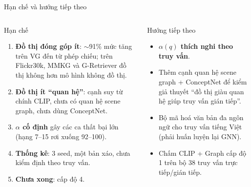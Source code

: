 \documentclass[10pt, aspectratio=169]{beamer}
\begin{document}
\begin{frame}{Hạn chế và hướng tiếp theo}
  \begin{columns}[T]
      \begin{alertblock}{Hạn chế}
        \begin{enumerate}\small
          \item \textbf{Đồ thị đóng góp ít}: $\sim$91\% mức tăng trên VG đến từ phép chiếu; trên Flickr30k, MMKG và G-Retriever đồ thị không hơn mô hình không đồ thị.
          \item \textbf{Đồ thị ít ``quan hệ''}: cạnh suy từ chính CLIP, chưa có quan hệ scene graph, chưa dùng ConceptNet.
          \item \textbf{$\alpha$ cố định} gây các ca thất bại lớn (hạng 7--15 rơi xuống 92--100).
          \item \textbf{Thống kê}: 3 seed, một bản xáo, chưa kiểm định theo truy vấn.
          \item \textbf{Chưa xong}: cấp độ 4.
        \end{enumerate}
      \end{alertblock}
      \begin{exampleblock}{Hướng tiếp theo}
        \begin{itemize}\small
          \item \textbf{$\alpha(q)$ thích nghi theo truy vấn}.
          \item Thêm cạnh quan hệ scene graph + ConceptNet để kiểm giả thuyết ``đồ thị giàu quan hệ giúp truy vấn gián tiếp''.
          \item Bộ mã hoá văn bản đa ngôn ngữ cho truy vấn tiếng Việt (phải huấn luyện lại GNN).
          \item Chấm CLIP + Graph cấp độ 1 trên bộ 38 truy vấn trực tiếp/gián tiếp.
        \end{itemize}
      \end{exampleblock}
  \end{columns}
\end{frame}
\end{document}
